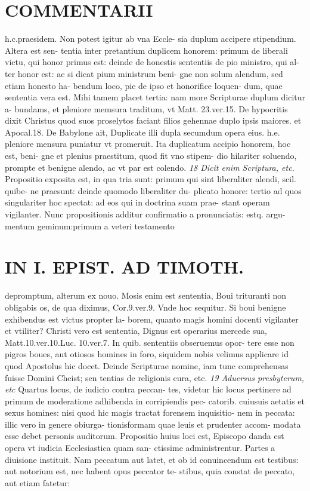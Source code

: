 \documentclass{article}
\begin{document}
\begin{pages}
\section*{COMMENTARII }
\marginpar{[ p.132 ]}\pstart h.c.praesidem. Non potest igitur ab vna Eccle- sia duplum accipere stipendium. Altera est sen- tentia inter pretantium duplicem honorem: primum de liberali victu, qui honor primus est: deinde de honestis sententiis de pio ministro, qui al- ter honor est: ac si dicat pium ministrum beni- gne non solum alendum, sed etiam honesto ha- bendum loco, pie de ipso et honorifice loquen- dum, quae sententia vera est. Mihi tamem placet tertia: nam more Scripturae duplum dicitur a- bundams, et pleniore memsura traditum, vt Matt. 23.ver.15. De hypocritis dixit Christus quod suos proselytos faciant filios gehennae duplo ipsis maiores. et Apocal.18. De Babylone ait, Duplicate illi dupla secumdum opera eius. h.e. pleniore mensura puniatur vt promeruit. Ita duplicatum accipio honorem, hoc est, beni- gne et plenius praestitum, quod fit vno stipem- dio hilariter soluendo, prompte et benigne alendo, ac vt par est colendo.  \pend
\textit{18 Dicit enim Scriptura, etc. }\pstart Propositio exposita est, in qua tria sunt: primum qui sint liberaliter alendi, scil. quibe- ne praesunt: deinde quomodo liberaliter du- plicato honore: tertio ad quos singulariter hoc spectat: ad eos qui in doctrina suam prae- stant operam vigilanter. Nunc propositionis additur confirmatio a pronunciatis: estq. argu- mentum geminum:primum a veteri testamento  \pend
\section*{IN I. EPIST. AD TIMOTH. }
\marginpar{[ p.133 ]}\pstart depromptum, alterum ex nouo. Mosis enim est sententia, Boui trituranti non obligabis os, de qua diximus, Cor.9.ver.9. Vnde hoc sequitur. Si boui benigne exhibendus est victus propter la- borem, quanto magis homini docenti vigilanter et vtiliter? Christi vero est sententia, Dignus est operarius mercede sua, Matt.10.ver.10.Luc. 10.ver.7. In quib. sententiis obseruemus opor- tere esse non pigros boues, aut otiosos homines in foro, siquidem nobis velimus applicare id quod Apostolus hic docet. Deinde Scripturae nomine, iam tunc comprehensas fuisse Domini Cheist; sen tentias de religionis cura, etc.  \pend
\textit{19 Aduersus presbyterum, etc }\pstart Quartus locus, de iudicio contra peccan- tes, videtur hic locus pertinere ad primum de moderatione adhibenda in corripiendis pec- catorib. cuiusuis aetatis et sexus homines: nisi quod hic magis tractat forensem inquisitio- nem in peccata: illic vero in genere obiurga- tionisformam quae leuis et prudenter accom- modata esse debet personis auditorum.  \pend\pstart Propositio huius loci est, Episcopo danda est opera vt iudicia Ecclesiastica quam san- ctissime administrentur.  \pend\pstart Partes a diuisione instituit. Nam peccatum aut latet, et ob id conuincendum est testibus: aut notorium est, nec habent opus peccator te- stibus, quia constat de peccato, aut etiam fatetur:  \pend

\end{pages}
\end{document}
